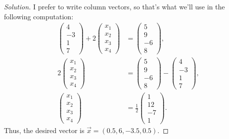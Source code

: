 \documentclass[letterpaper, 12pt]{amsart}
\theoremstyle{definition}  %
\begin{document}
		\begin{proof}[Solution]
		I prefer to write column vectors, so that's what we'll use in the following computation:
		\begin{align*}
		\begin{pmatrix} 4 \\ -3 \\ 1 \\ 7 \end{pmatrix} + 2 \begin{pmatrix} x_{1} \\ x_{2} \\ x_{3} \\ x_{4} \end{pmatrix} &= \begin{pmatrix} 5 \\ 9 \\ -6 \\ 8 \end{pmatrix}, \\
		2 \begin{pmatrix} x_{1} \\ x_{2} \\ x_{3} \\ x_{4} \end{pmatrix} &= \begin{pmatrix} 5 \\ 9 \\ -6 \\ 8 \end{pmatrix} - \begin{pmatrix} 4 \\ -3 \\ 1 \\ 7 \end{pmatrix}, \\
		\begin{pmatrix} x_{1} \\ x_{2} \\ x_{3} \\ x_{4} \end{pmatrix} &= \frac{1}{2}\begin{pmatrix} 1 \\ 12 \\ -7 \\ 1 \end{pmatrix}.
		\end{align*}
		Thus, the desired vector is $\vec{x} = (0.5, 6, -3.5, 0.5)$.
		\end{proof}
\end{document}
